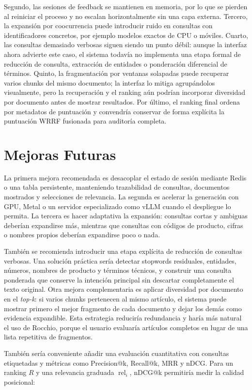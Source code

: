 \documentclass[a4paper]{llncs}
\begin{document}
Segundo, las sesiones de feedback se mantienen en memoria, por lo que se pierden al reiniciar el proceso y no escalan horizontalmente sin una capa externa. Tercero, la expansión por coocurrencia puede introducir ruido en consultas con identificadores concretos, por ejemplo modelos exactos de CPU o móviles. Cuarto, las consultas demasiado verbosas siguen siendo un punto débil: aunque la interfaz ahora advierte este caso, el sistema todavía no implementa una etapa formal de reducción de consulta, extracción de entidades o ponderación diferencial de términos. Quinto, la fragmentación por ventanas solapadas puede recuperar varios chunks del mismo documento; la interfaz lo mitiga agrupándolos visualmente, pero la recuperación y el ranking aún podrían incorporar diversidad por documento antes de mostrar resultados. Por último, el ranking final ordena por metadatos de puntuación y convendría conservar de forma explícita la puntuación WRRF fusionada para auditoría completa.

\section{Mejoras Futuras}

La primera mejora recomendada es desacoplar el estado de sesión mediante Redis o una tabla persistente, manteniendo trazabilidad de consultas, documentos mostrados y selecciones de relevancia. La segunda es acelerar la generación con GPU, Metal o un servidor especializado como vLLM cuando el despliegue lo permita. La tercera es hacer adaptativa la expansión: consultas cortas y ambiguas deberían expandirse más, mientras que consultas con códigos de producto, cifras o nombres propios deberían expandirse poco o nada.

También se recomienda introducir una etapa explícita de reducción de consultas verbosas. Una solución práctica sería detectar stopwords residuales, entidades, números, nombres de producto y términos técnicos, y construir una consulta ponderada que conserve la intención principal sin descartar completamente el texto original. Otra mejora complementaria es aplicar diversidad por documento en el \textit{top-k}: si varios chunks pertenecen al mismo artículo, el sistema puede mostrar primero el mejor fragmento de cada documento y dejar los demás como evidencia expandible. Esta estrategia reduciría redundancia y haría más natural el uso de Rocchio, porque el usuario evaluaría artículos completos en lugar de una lista repetitiva de fragmentos.

También sería conveniente añadir una evaluación cuantitativa con consultas etiquetadas y métricas como Precision@k, Recall@k, MRR y nDCG. Para un ranking $R$ y una relevancia graduada $\operatorname{rel}_i$, nDCG@k permitiría medir la calidad posicional:
\end{document}
